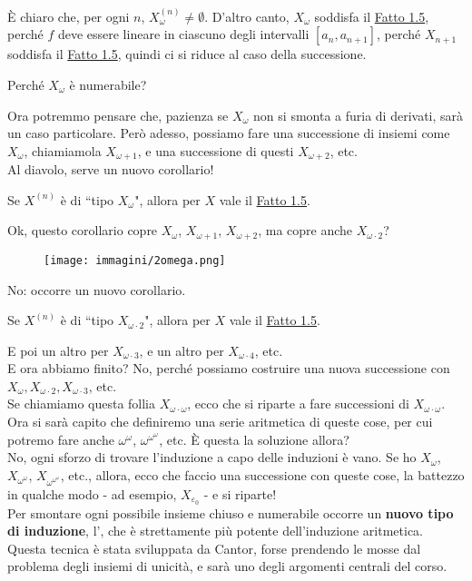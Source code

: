 \documentclass[11pt]{scrartcl}
\begin{document}
È chiaro che, per ogni $n$, $X_\omega^{(n)} \ne \emptyset$. D'altro canto, $X_\omega$ soddisfa il \hyperref[unicità]{Fatto 1.5}, perché $f$ deve essere lineare in ciascuno degli intervalli
$[a_n,a_{n+1}]$, perché $X_{n+1}$ soddisfa il \hyperref[unicità]{Fatto 1.5}, quindi ci si riduce al caso della successione.

\begin{exercise}
Perché $X_\omega$ è numerabile?
\end{exercise}

Ora potremmo pensare che, pazienza se $X_\omega$ non si smonta a furia di derivati, sarà un caso particolare. Però adesso, possiamo fare una successione di insiemi come $X_\omega$, chiamiamola $X_{\omega+1}$, e 
una successione di questi $X_{\omega+2}$, etc.\\
Al diavolo, serve un nuovo corollario!

\begin{corollary}
Se $X^{(n)}$ è di ``tipo $X_\omega$", allora per $X$ vale il \hyperref[unicità]{Fatto 1.5}.
\end{corollary}

Ok, questo corollario copre $X_\omega$, $X_{\omega + 1}$, $X_{\omega + 2}$, ma copre anche $X_{\omega \cdot 2}$?
\pagebreak
\begin{center}
	\begin{figure}[h]
		\centering
		\texttt{[image: immagini/2omega.png]}
	\end{figure}
\end{center}

No: occorre un nuovo corollario.

\begin{corollary}
Se $X^{(n)}$ è di ``tipo $X_{\omega \cdot 2}$", allora per $X$ vale il \hyperref[unicità]{Fatto 1.5}.
\end{corollary}

E poi un altro per $X_{\omega \cdot 3}$, e un altro per $X_{\omega \cdot 4}$, etc.\\
E ora abbiamo finito? No, perché possiamo costruire una nuova successione con $X_{\omega},X_{\omega \cdot 2},X_{\omega \cdot 3}$, etc.\\
Se chiamiamo questa follia $X_{\omega \cdot \omega}$, ecco che si riparte a fare successioni di $X_{\omega \cdot \omega}$. Ora si sarà capito che definiremo
una serie aritmetica di queste cose, per cui potremo fare anche $\omega^\omega$, $\omega^{\omega^{\omega}}$, etc. È questa la soluzione allora?\\
No, ogni sforzo di trovare l'induzione a capo delle induzioni è vano. Se ho $X_{\omega}$, $X_{\omega^\omega}$, $X_{\omega^{\omega^{\omega}}}$, etc., allora,
ecco che faccio una successione con queste cose, la battezzo in qualche modo - ad esempio, $X_{\varepsilon_0}$ - e si riparte!\\
Per smontare ogni possibile insieme chiuso e numerabile occorre un \textbf{nuovo tipo di induzione}, l', che è strettamente più potente dell'induzione aritmetica.
Questa tecnica è stata sviluppata da Cantor, forse prendendo le mosse dal problema degli insiemi di unicità, e sarà uno degli argomenti centrali del corso.
\end{document}
